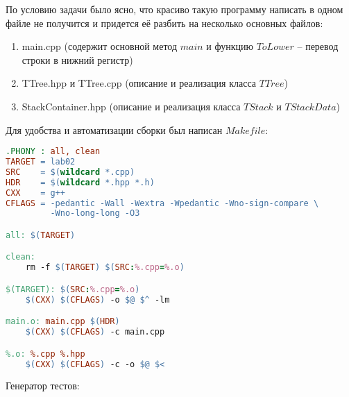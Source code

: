 \documentclass[12pt]{article}
\begin{document}
По условию задачи было ясно, что красиво такую программу написать в одном файле не получится и придется её разбить на несколько основных файлов:
\begin{enumerate}
	\item main.cpp (содержит основной метод $main$ и функцию $ToLower$ -- перевод строки в нижний регистр)
	\item TTree.hpp и TTree.cpp (описание и реализация класса $TTree$)
	\item StackContainer.hpp (описание и реализация класса $TStack$ и $TStackData$)
\end{enumerate}
Для удобства и автоматизации сборки был написан $Makefile$:
\begin{lstlisting}[language=make]
.PHONY : all, clean
TARGET = lab02
SRC    = $(wildcard *.cpp)
HDR    = $(wildcard *.hpp *.h)
CXX    = g++
CFLAGS = -pedantic -Wall -Wextra -Wpedantic -Wno-sign-compare \
         -Wno-long-long -O3

all: $(TARGET)

clean:
	rm -f $(TARGET) $(SRC:%.cpp=%.o)

$(TARGET): $(SRC:%.cpp=%.o)
	$(CXX) $(CFLAGS) -o $@ $^ -lm

main.o: main.cpp $(HDR)
	$(CXX) $(CFLAGS) -c main.cpp

%.o: %.cpp %.hpp
	$(CXX) $(CFLAGS) -c -o $@ $<

\end{lstlisting}

Генератор тестов:
 
\end{document}
